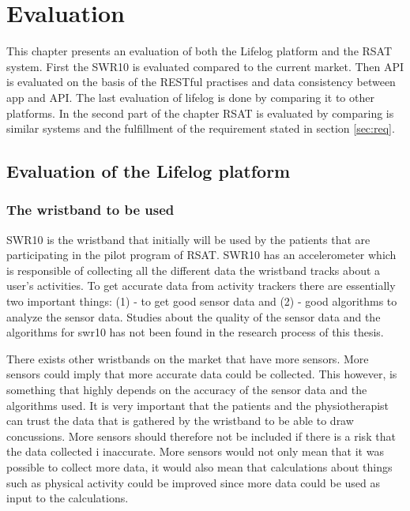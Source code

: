 \documentclass{cslthse-msc}
\begin{document}
\chapter{Evaluation}
 This chapter presents an evaluation of both the Lifelog platform and the RSAT system. First the SWR10 is evaluated compared to the current market. Then API is evaluated on the basis of the RESTful practises and data consistency between app and API. The last evaluation of lifelog is done by comparing it to other platforms. In the second part of the chapter RSAT is evaluated by comparing is similar systems and the fulfillment of the requirement stated in section \ref{sec:req}. 

\section{Evaluation of the Lifelog platform}
\label{sec:utLifelog}

\subsection{The wristband to be used}
SWR10 is the wristband that initially will be used by the patients that are participating in the pilot program of RSAT. SWR10 has an accelerometer which is responsible of collecting all the different data the wristband tracks about a user’s activities.
To get accurate data from activity trackers there are essentially two important things: (1) - to get good sensor data and (2) - good algorithms to analyze the sensor data. Studies about the quality of the sensor data and the algorithms for swr10 has not been found in the research process of this thesis.   

There exists other wristbands on the market that have more sensors. More sensors could imply that more accurate data could be collected. This however, is something that highly depends on the accuracy of the sensor data and the algorithms used. It is very important that the patients and the physiotherapist can trust the data that is gathered by the wristband to be able to draw concussions. More sensors should therefore not be included if there is a risk that the data collected i inaccurate. More sensors would not only mean that it was possible to collect more data, it would also mean that calculations about things such as physical activity could be improved since more data could be used as input to the calculations. 
\end{document}
